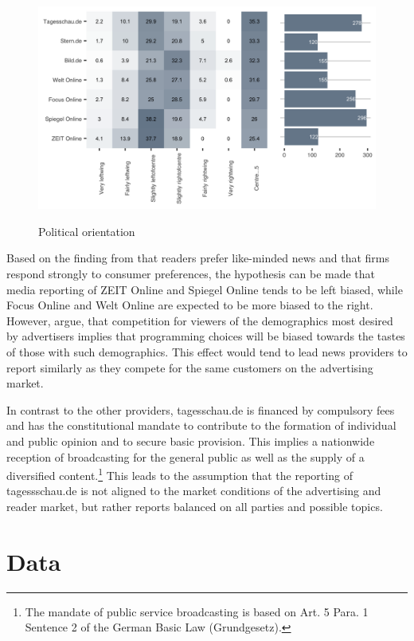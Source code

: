 \documentclass[12pt,a4paper,notitlepage]{article}
\begin{document}
\begin{figure}[H]
\begin{center}
	\caption{Political orientation }
	\includegraphics[width=.9\textwidth]{../figs/reuters3}
	\label{fig_reuters3}
	\end{center}
\end{figure}

Based on the finding from \citet{gentzkow_what_2010} that readers prefer like-minded news and that firms respond strongly to consumer preferences, the hypothesis can be made that media reporting of ZEIT Online and Spiegel Online tends to be left biased, while Focus Online and Welt Online are expected to be more biased to the right. However, \citet{anderson_media_2006} argue, that competition for viewers of the demographics most desired by advertisers implies that programming choices will be biased towards the tastes of those with such demographics. This effect would tend to lead news providers to report similarly as they compete for the same customers on the advertising market.

In contrast to the other providers, tagesschau.de is financed by compulsory fees and has the constitutional mandate to contribute to the formation of individual and public opinion and to secure basic provision. This implies a nationwide reception of broadcasting for the general public as well as the supply of a diversified content.\footnote{The mandate of public service broadcasting is based on Art. 5 Para. 1 Sentence 2 of the German Basic Law (Grundgesetz).} This leads to the assumption that the reporting of tagessschau.de is not aligned to the market conditions of the advertising and reader market, but rather reports balanced on all parties and possible topics.


\section{Data}\label{ch_method}
\end{document}
